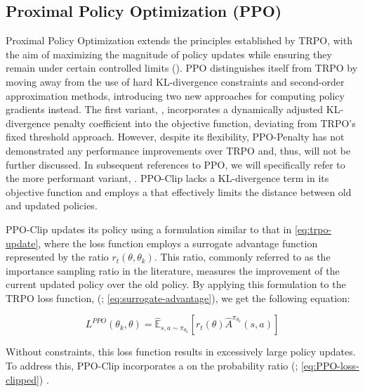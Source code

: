 \subsection{Proximal Policy Optimization (PPO)}
\label{sec:ppo}

\noindent Proximal Policy Optimization extends the principles established by TRPO, with the aim of maximizing the magnitude of policy updates while ensuring they remain under certain controlled limits (\textcolor{deepblue}{\cite{schulman2017proximal}}). PPO distinguishes itself from TRPO by moving away from the use of hard KL-divergence constraints and second-order approximation methods, introducing two new approaches for computing policy gradients instead. The first variant, , incorporates a dynamically adjusted KL-divergence penalty coefficient into the objective function, deviating from TRPO's fixed threshold approach. However, despite its flexibility, PPO-Penalty has not demonstrated any performance improvements over TRPO and, thus, will not be further discussed. In subsequent references to PPO, we will specifically refer to the more performant variant, . PPO-Clip lacks a KL-divergence term in its objective function and employs a  that effectively limits the distance between old and updated policies.

\bigskip

\noindent PPO-Clip updates its policy using a formulation similar to that in \textcolor{deepblue}{\autoref{eq:trpo-update}}, where the loss function employs a surrogate advantage function represented by the ratio $r_t(\theta, \theta_k)$. This ratio, commonly referred to as the importance sampling ratio in the literature, measures the improvement of the current updated policy over the old policy. By applying this formulation to the TRPO loss function, (\textcolor{deepblue}{\cite{schulman2017proximal}; \autoref{eq:surrogate-advantage}}), we get the following equation:

\begin{equation}
    L^{PPO}(\theta_k, \theta) = \mathbb{\hat{E}}_{s, a \sim \pi_{\theta_k}} \left [ r_t(\theta) \hat{A}^{\pi_{\theta_k}}(s, a)\right]
    \label{eq:PPO-loss}
\end{equation}


\noindent Without constraints, this loss function results in excessively large policy updates. To address this, PPO-Clip incorporates a  on the probability ratio (\textcolor{deepblue}{\cite{schulman2017proximal}; \autoref{eq:PPO-loss-clipped}}) \protect\footnotemark.

